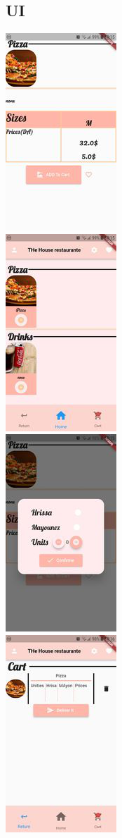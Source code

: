\documentclass{article}
\begin{document}
\subsection{UI}
\includegraphics[scale=1]{./out/MobileApp/Ui/1.png}\\
\includegraphics[scale=1]{./out/MobileApp/Ui/2.png}\\
\includegraphics[scale=1]{./out/MobileApp/Ui/3.png}\\
\includegraphics[scale=1]{./out/MobileApp/Ui/4.png}\\
\end{document}
